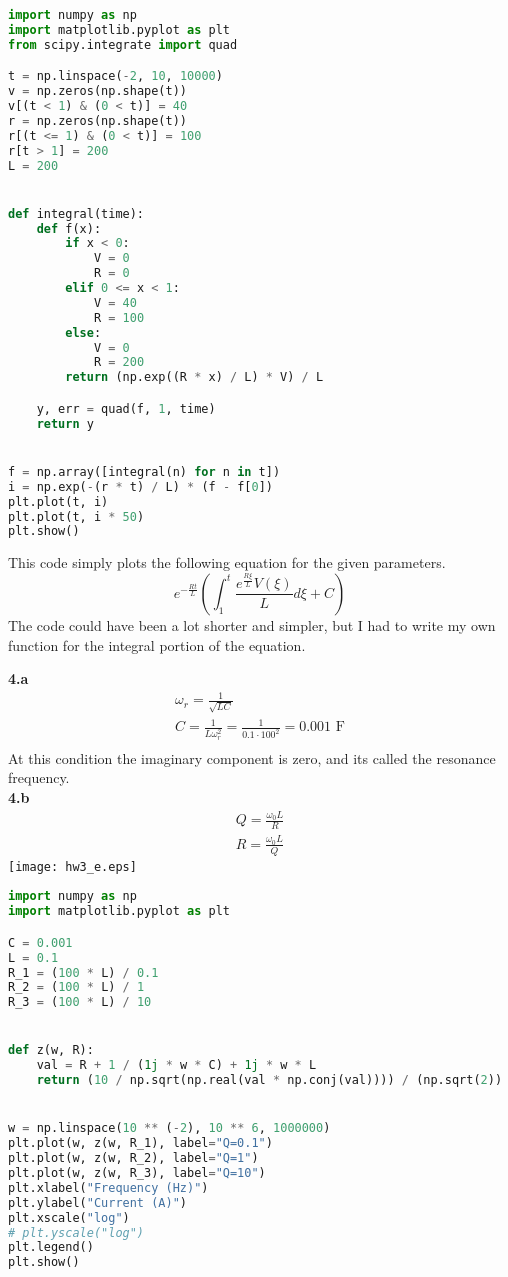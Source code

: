 \documentclass[12pt]{article}
\begin{document}
    \begin{lstlisting}[language=Python,label={lst:lstlisting}]
import numpy as np
import matplotlib.pyplot as plt
from scipy.integrate import quad

t = np.linspace(-2, 10, 10000)
v = np.zeros(np.shape(t))
v[(t < 1) & (0 < t)] = 40
r = np.zeros(np.shape(t))
r[(t <= 1) & (0 < t)] = 100
r[t > 1] = 200
L = 200


def integral(time):
    def f(x):
        if x < 0:
            V = 0
            R = 0
        elif 0 <= x < 1:
            V = 40
            R = 100
        else:
            V = 0
            R = 200
        return (np.exp((R * x) / L) * V) / L

    y, err = quad(f, 1, time)
    return y


f = np.array([integral(n) for n in t])
i = np.exp(-(r * t) / L) * (f - f[0])
plt.plot(t, i)
plt.plot(t, i * 50)
plt.show()

    \end{lstlisting}

    This code simply plots the following equation for the given parameters.
    \[e^{-\frac{Rt}{L}}\left(\int_{1}^{t}\frac{e^{\frac{R\xi}{L}}V\left(\xi\right)}{L}d\xi+C\right)\]
    The code could have been a lot shorter and simpler, but I had to write my own function for the integral portion of
    the equation.

    \textbf{4.a}
    \begin{gather*}
        \omega_r=\frac{1}{\sqrt{LC}}\\
        C=\frac{1}{L\omega_r^2}=\frac{1}{0.1\cdot100^2}=0.001\text{ F}\\
    \end{gather*}
    At this condition the imaginary component is zero, and its called the resonance frequency.\\
    \textbf{4.b}
    \begin{gather*}
        Q=\frac{\omega_{0}L}{R}\\
        R=\frac{\omega_0 L}{Q}
    \end{gather*}
    \texttt{[image: hw3\_e.eps]}
    \begin{lstlisting}[language=Python,label={lst:lstlisting2}]
import numpy as np
import matplotlib.pyplot as plt

C = 0.001
L = 0.1
R_1 = (100 * L) / 0.1
R_2 = (100 * L) / 1
R_3 = (100 * L) / 10


def z(w, R):
    val = R + 1 / (1j * w * C) + 1j * w * L
    return (10 / np.sqrt(np.real(val * np.conj(val)))) / (np.sqrt(2))


w = np.linspace(10 ** (-2), 10 ** 6, 1000000)
plt.plot(w, z(w, R_1), label="Q=0.1")
plt.plot(w, z(w, R_2), label="Q=1")
plt.plot(w, z(w, R_3), label="Q=10")
plt.xlabel("Frequency (Hz)")
plt.ylabel("Current (A)")
plt.xscale("log")
# plt.yscale("log")
plt.legend()
plt.show()
    \end{lstlisting}
\end{document}
